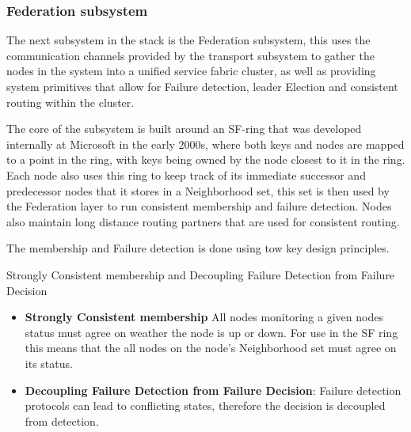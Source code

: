\documentclass[a4paper,10pt,titlepage]{report}
\begin{document}
    \subsubsection{Federation subsystem}

    The next subsystem in the stack is the Federation subsystem, this uses the communication channels provided by the transport subsystem to gather the nodes in the system into a unified service fabric cluster, as well as providing system primitives that allow for Failure detection, leader Election and consistent routing within the cluster.\\
    \vspace{5mm}

    The core of the subsystem is built around an SF-ring that was developed internally at Microsoft in the early 2000s, where both keys and nodes are mapped to a point in the ring, with keys being owned by the node closest to it in the ring. Each node also uses this ring to keep track of its immediate successor and predecessor nodes that it stores in a Neighborhood set, this set is then used by the Federation layer to run consistent membership and failure detection. Nodes also maintain long distance routing partners that are used for consistent routing.\\
    \vspace{5mm}

    The membership and Failure detection is done using tow key design principles.\\
    \vspace{5mm}

    Strongly Consistent membership and Decoupling Failure Detection from Failure Decision\\
    \vspace{5mm}

    \begin{itemize}
        \item \textbf{Strongly Consistent membership} All nodes monitoring a given nodes status must agree on weather the node is up or down. For use in the SF ring this means that the all nodes on the node's Neighborhood set must agree on its status.
        \item \textbf{Decoupling Failure Detection from Failure Decision}: Failure detection protocols can lead to conflicting states, therefore the decision is decoupled from detection.
    \end{itemize}
    \vspace{5mm}
\end{document}
